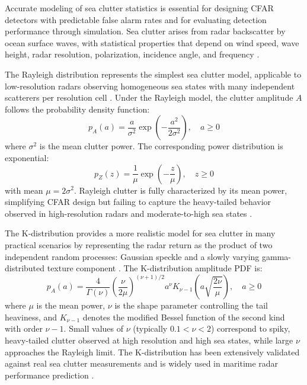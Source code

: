 Accurate modeling of sea clutter statistics is essential for designing CFAR detectors with predictable false alarm rates and for evaluating detection performance through simulation. Sea clutter arises from radar backscatter by ocean surface waves, with statistical properties that depend on wind speed, wave height, radar resolution, polarization, incidence angle, and frequency \cite{Ward2006}.

The Rayleigh distribution represents the simplest sea clutter model, applicable to low-resolution radars observing homogeneous sea states with many independent scatterers per resolution cell \cite{Skolnik2008}. Under the Rayleigh model, the clutter amplitude $A$ follows the probability density function:
\begin{equation}
p_A(a) = \frac{a}{\sigma^2} \exp \left( -\frac{a^2}{2\sigma^2} \right), \quad a \geq 0
\end{equation}
where $\sigma^2$ is the mean clutter power. The corresponding power distribution is exponential:
\begin{equation}
p_Z(z) = \frac{1}{\mu} \exp \left( -\frac{z}{\mu} \right), \quad z \geq 0
\end{equation}
with mean $\mu = 2\sigma^2$. Rayleigh clutter is fully characterized by its mean power, simplifying CFAR design but failing to capture the heavy-tailed behavior observed in high-resolution radars and moderate-to-high sea states \cite{Ward2013}.

The K-distribution provides a more realistic model for sea clutter in many practical scenarios by representing the radar return as the product of two independent random processes: Gaussian speckle and a slowly varying gamma-distributed texture component \cite{Ward1981}. The K-distribution amplitude PDF is:
\begin{equation}
p_A(a) = \frac{4}{\Gamma(\nu)} \left( \frac{\nu}{2\mu} \right)^{(\nu+1)/2} a^{\nu} K_{\nu-1} \left( a \sqrt{\frac{2\nu}{\mu}} \right), \quad a \geq 0
\end{equation}
where $\mu$ is the mean power, $\nu$ is the shape parameter controlling the tail heaviness, and $K_{\nu-1}$ denotes the modified Bessel function of the second kind with order $\nu - 1$. Small values of $\nu$ (typically $0.1 < \nu < 2$) correspond to spiky, heavy-tailed clutter observed at high resolution and high sea states, while large $\nu$ approaches the Rayleigh limit. The K-distribution has been extensively validated against real sea clutter measurements and is widely used in maritime radar performance prediction \cite{Watts2022}.

